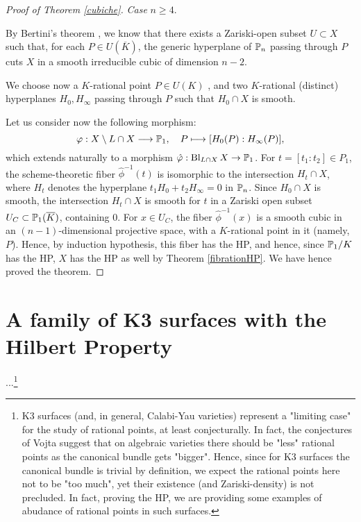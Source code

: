 \documentclass[a4paper,12pt]{article}
\begin{document}
\begin{proof}[Proof of Theorem \ref{cubiche}]
	
	\emph{Case} $n \geq 4$.

	By Bertini's theorem \cite[Remark 10.9.2]{hartshorne}, we know that there exists a Zariski-open subset $U \subset X$ such that, for each $P \in U(\overline{K})$, the generic hyperplane of $\P_n$ passing through $P$ cuts $X$ in a smooth irreducible cubic of dimension $n-2$.
	
	 We choose now a $K$-rational point $P \in U(K)$ %
	, and two $K$-rational (distinct) hyperplanes $H_0, H_{\infty}$ passing through $P$ such that $H_0 \cap X$ is smooth.
	
	Let us consider now the following morphism:
	\begin{equation*}
		\phi:  X \setminus L \cap X \longrightarrow \P_1, \quad
		P \longmapsto [H_0(P):H_{\infty}(P)],
	\end{equation*}
	which extends naturally to a morphism $\hat{\phi}: \Blowup_{L \cap X}X \rightarrow \P_1$. For $t=[t_1:t_2] \in P_1$, the scheme-theoretic fiber $\hat{\phi}^{-1}(t)$ is isomorphic to the intersection $H_t \cap X$, where $H_t$ denotes the hyperplane $t_1H_0+t_2H_{\infty}=0$ in $\P_n$. Since $H_0 \cap X$ is smooth, the intersection $H_t \cap X$ is smooth for $t$ in a Zariski open subset $U_C \subset \P_1(\overline{K})$, containing $0$. For $x \in U_C$, the fiber $\hat{\phi}^{-1}(x)$ is a smooth cubic in an $(n-1)$-dimensional projective space, with a $K$-rational point in it (namely, $P$). Hence, by induction hypothesis, this fiber has the HP, and hence, since $\P_1/K$ has the HP, $X$ has the HP as well by Theorem \ref{fibrationHP}. We have hence proved the theorem.
\end{proof}



\section{A family of K3 surfaces with the Hilbert Property}

 ...\footnote{K3 surfaces (and, in general, Calabi-Yau varieties) represent a "limiting case" for the study of rational points, at least conjecturally. In fact, the conjectures of Vojta suggest that on algebraic varieties there should be "less" rational points as the canonical bundle gets "bigger". Hence, since for K3 surfaces the canonical bundle is trivial by definition, we expect the rational points here not to be "too much", yet their existence (and Zariski-density) is not precluded. In fact, proving the HP, we are providing some examples of abudance of rational points in such surfaces.}
\end{document}
